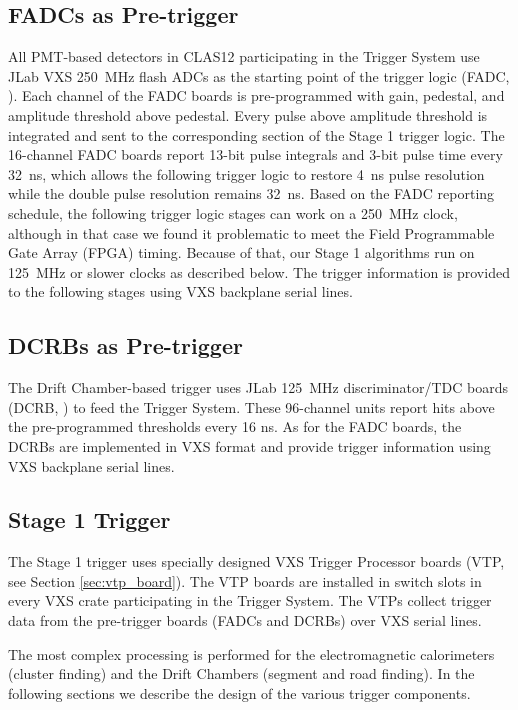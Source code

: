 \subsection{FADCs as Pre-trigger}

All PMT-based detectors in CLAS12 participating in the Trigger System use JLab VXS 250~MHz flash ADCs as the starting point of the trigger logic (FADC, \cite{daq-ref}). Each channel of the FADC boards is pre-programmed with gain, pedestal, and amplitude threshold above pedestal. Every pulse above amplitude threshold is integrated and sent to the corresponding section of the Stage 1 trigger logic. The 16-channel FADC boards report 13-bit pulse integrals and 3-bit pulse time every 32~ns, which allows the following trigger logic to restore 4~ns pulse resolution while the double pulse resolution remains 32~ns. Based on the FADC reporting schedule, the following trigger logic stages can work on a 250~MHz clock, although in that case we found it problematic to meet the Field Programmable Gate Array (FPGA) timing. Because of that, our Stage 1 algorithms run on 125~MHz or slower clocks as described below. The trigger information is provided to the following stages using VXS backplane serial lines.


\subsection{DCRBs as Pre-trigger}

The Drift Chamber-based trigger uses JLab 125~MHz discriminator/TDC boards (DCRB, \cite{daq-ref}) to feed the Trigger System. These 96-channel units report hits above the pre-programmed thresholds every 16 ns. As for the FADC boards, the DCRBs are implemented in VXS format and provide trigger information using VXS backplane serial lines.


\subsection{Stage 1 Trigger} 

The Stage 1 trigger uses specially designed VXS Trigger Processor boards (VTP, see Section \ref*{sec:vtp_board}). The VTP boards are installed in switch slots in every VXS crate participating in the Trigger System. The VTPs collect trigger data from the pre-trigger boards (FADCs and DCRBs) over VXS serial lines.

The most complex processing is performed for the electromagnetic calorimeters (cluster finding) and the Drift Chambers (segment and road finding). In the following sections we describe the design of the various trigger components.


